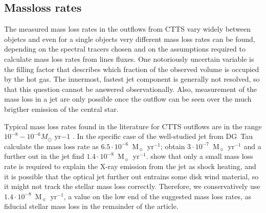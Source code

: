 \subsection{Massloss rates}
The measured mass loss rates in the outflows from CTTS vary widely between objetcs and even for a single objects very different mass loss rates can be found, depending on the spectral tracers chosen and on the assumptions required to calculate mass loss rates from lines fluxes. One notoriously uncertain variable is the filling factor that describes which fraction of the observed volume is occupied by the hot gas. The innermost, fastest jet component is generally not resolved, so that this question cannot be answered observationally. Also, measurement of the mass loss in a jet are only possible once the outflow can be seen over the much brigther emission of the central star. 

Typical mass loss rates found in the literature for CTTS outflows are in the range $10^{-8}-10^{-6}M_{\odot}\textrm{ yr}{-1}$ \citep{1999A&A...342..717B,2006A&A...456..189P}. In the specific case of the well-studied jet from DG~Tau \citet{1997A&A...327..671L} calculate the  mass loss rate as $6.5\cdot 10^{-6}$~M$_{\sun}$~yr$^{-1}$; \citet{1995ApJ...452..736H}
obtain $3\cdot 10^{-7}$~M$_{\sun}$~yr$^{-1}$ and a further out in the jet \citet{2000A&A...356L..41L} find $1.4\cdot 10^{-8}$~M$_{\sun}$~yr$^{-1}$. 
\citet{2009A&A...493..579G} show that only a small mass loss rate is required to explain the X-ray emission from the jet as shock heating, and it is possible that the optical jet further out entrains some disk wind material, so it might not track the stellar mass loss correctly.
Therefore, we conservatively use $1.4\cdot 10^{-8}$~M$_{\sun}$~yr$^{-1}$, a value on the low end of the suggested mass loss rates, as fiducial stellar mass loss in the remainder of the article.